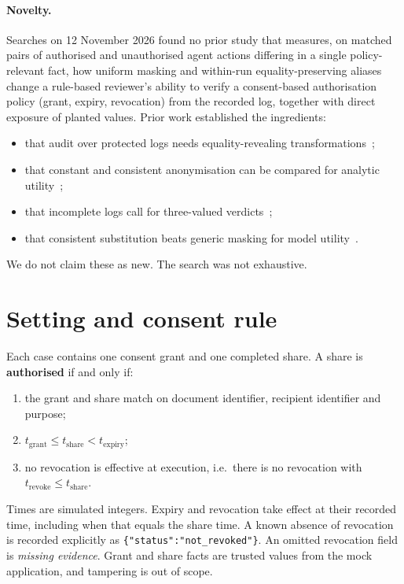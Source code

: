 \documentclass[11pt]{article}
\newcommand{\code}[1]{\texttt{#1}}
\begin{document}
\paragraph{Novelty.}
Searches on 12 November 2026 found no prior study that measures, on matched pairs of authorised and unauthorised agent actions differing in a single policy-relevant fact, how uniform masking and within-run equality-preserving aliases change a rule-based reviewer's ability to verify a consent-based authorisation policy (grant, expiry, revocation) from the recorded log, together with direct exposure of planted values. Prior work established the ingredients:
\begin{itemize}
  \item that audit over protected logs needs equality-revealing transformations~\cite{chowdhury2015equivalence};
  \item that constant and consistent anonymisation can be compared for analytic utility~\cite{lakkaraju2008utility};
  \item that incomplete logs call for three-valued verdicts~\cite{garg2011incomplete,nian2026auditable};
  \item that consistent substitution beats generic masking for model utility~\cite{xia2026slotguard}.
\end{itemize}
We do not claim these as new. The search was not exhaustive.

\section{Setting and consent rule}

Each case contains one consent grant and one completed share. A share is \textbf{authorised} if and only if:
\begin{enumerate}
  \item the grant and share match on document identifier, recipient identifier and purpose;
  \item $t_{\text{grant}} \le t_{\text{share}} < t_{\text{expiry}}$;
  \item no revocation is effective at execution, i.e.\ there is no revocation with $t_{\text{revoke}} \le t_{\text{share}}$.
\end{enumerate}
Times are simulated integers. Expiry and revocation take effect at their recorded time, including when that equals the share time. A known absence of revocation is recorded explicitly as \code{\{"status":"not\_revoked"\}}. An omitted revocation field is \emph{missing evidence}. Grant and share facts are trusted values from the mock application, and tampering is out of scope.
\end{document}
